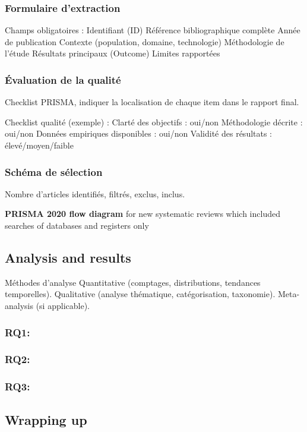 \documentclass[a4paper,12pt]{article}
\begin{document}
\subsubsection{Formulaire d’extraction}
\label{sec:org1405226}
Champs obligatoires :
    Identifiant (ID)
    Référence bibliographique complète
    Année de publication
    Contexte (population, domaine, technologie)
    Méthodologie de l’étude
    Résultats principaux (Outcome)
    Limites rapportées
\subsubsection{Évaluation de la qualité}
\label{sec:orgcb8d579}
Checklist PRISMA, indiquer la localisation de chaque item dans le rapport final.

Checklist qualité (exemple) :
    Clarté des objectifs : oui/non
    Méthodologie décrite : oui/non
    Données empiriques disponibles : oui/non
    Validité des résultats : élevé/moyen/faible
\subsubsection{Schéma de sélection}
\label{sec:org3023e81}
Nombre d’articles identifiés, filtrés, exclus, inclus.

\textbf{PRISMA 2020 flow diagram} for new systematic reviews which included searches of databases and registers only
\subsection{Analysis and results}
\label{sec:org64d3f9c}
Méthodes d’analyse
    Quantitative (comptages, distributions, tendances temporelles).
    Qualitative (analyse thématique, catégorisation, taxonomie).
    Meta-analysis (si applicable).
\subsubsection{RQ1:}
\label{sec:orgcc67b77}
\subsubsection{RQ2:}
\label{sec:orgba60aa6}
\subsubsection{RQ3:}
\label{sec:org9c06e2f}
\subsection{Wrapping up}
\label{sec:org480eae9}
\end{document}
